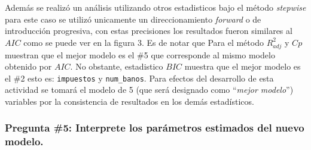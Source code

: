 \documentclass[
]{article}
\begin{document}
Además se realizó un análisis utilizando otros estadisticos bajo el
método \emph{stepwise} para este caso se utilizó unicamente un
direccionamiento \emph{forward} o de introducción progresiva, con estas
precisiones los resultados fueron similares al \(AIC\) como se puede ver
en la figura 3. Es de notar que Para el método \(R^2_{adj}\) y \(Cp\)
muestran que el mejor modelo es el \#5 que corresponde al mismo modelo
obtenido por \(AIC\). No obstante, estadistico \(BIC\) muestra que el
mejor modelo es el \#2 esto es: \texttt{impuestos} y
\texttt{num\_banos}. Para efectos del desarrollo de esta actividad se
tomará el modelo de 5 (que será designado como ``\emph{mejor modelo}'')
variables por la consistencia de resultados en los demás estadísticos.

\hypertarget{pregunta-5-interprete-los-paruxe1metros-estimados-del-nuevo-modelo.}{%
\subsubsection{Pregunta \#5: Interprete los parámetros estimados del
nuevo
modelo.}\label{pregunta-5-interprete-los-paruxe1metros-estimados-del-nuevo-modelo.}}
\end{document}
